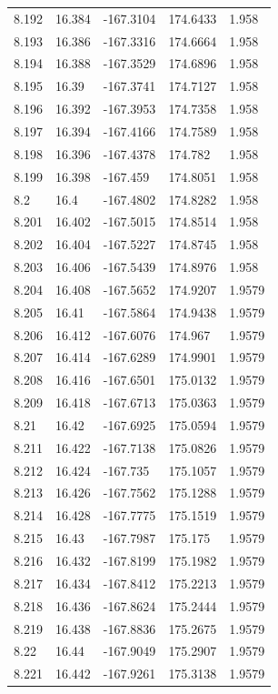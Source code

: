 \begin{tabular}{lllll}
8.192 & 16.384 & -167.3104 & 174.6433 & 1.958 \\
8.193 & 16.386 & -167.3316 & 174.6664 & 1.958 \\
8.194 & 16.388 & -167.3529 & 174.6896 & 1.958 \\
8.195 & 16.39 & -167.3741 & 174.7127 & 1.958 \\
8.196 & 16.392 & -167.3953 & 174.7358 & 1.958 \\
8.197 & 16.394 & -167.4166 & 174.7589 & 1.958 \\
8.198 & 16.396 & -167.4378 & 174.782 & 1.958 \\
8.199 & 16.398 & -167.459 & 174.8051 & 1.958 \\
8.2 & 16.4 & -167.4802 & 174.8282 & 1.958 \\
8.201 & 16.402 & -167.5015 & 174.8514 & 1.958 \\
8.202 & 16.404 & -167.5227 & 174.8745 & 1.958 \\
8.203 & 16.406 & -167.5439 & 174.8976 & 1.958 \\
8.204 & 16.408 & -167.5652 & 174.9207 & 1.9579 \\
8.205 & 16.41 & -167.5864 & 174.9438 & 1.9579 \\
8.206 & 16.412 & -167.6076 & 174.967 & 1.9579 \\
8.207 & 16.414 & -167.6289 & 174.9901 & 1.9579 \\
8.208 & 16.416 & -167.6501 & 175.0132 & 1.9579 \\
8.209 & 16.418 & -167.6713 & 175.0363 & 1.9579 \\
8.21 & 16.42 & -167.6925 & 175.0594 & 1.9579 \\
8.211 & 16.422 & -167.7138 & 175.0826 & 1.9579 \\
8.212 & 16.424 & -167.735 & 175.1057 & 1.9579 \\
8.213 & 16.426 & -167.7562 & 175.1288 & 1.9579 \\
8.214 & 16.428 & -167.7775 & 175.1519 & 1.9579 \\
8.215 & 16.43 & -167.7987 & 175.175 & 1.9579 \\
8.216 & 16.432 & -167.8199 & 175.1982 & 1.9579 \\
8.217 & 16.434 & -167.8412 & 175.2213 & 1.9579 \\
8.218 & 16.436 & -167.8624 & 175.2444 & 1.9579 \\
8.219 & 16.438 & -167.8836 & 175.2675 & 1.9579 \\
8.22 & 16.44 & -167.9049 & 175.2907 & 1.9579 \\
8.221 & 16.442 & -167.9261 & 175.3138 & 1.9579 \\

\end{tabular}
